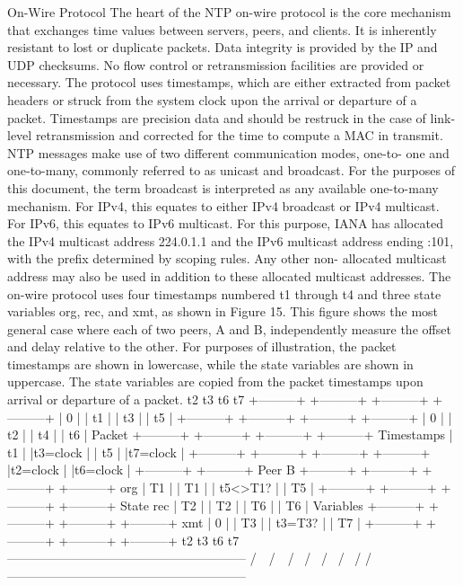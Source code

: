  On-Wire Protocol
 The heart of the NTP on-wire protocol is the core mechanism that
 exchanges time values between servers, peers, and clients. It is
 inherently resistant to lost or duplicate packets. Data integrity is
 provided by the IP and UDP checksums. No flow control or
 retransmission facilities are provided or necessary. The protocol
 uses timestamps, which are either extracted from packet headers or
 struck from the system clock upon the arrival or departure of a
 packet. Timestamps are precision data and should be restruck in the
 case of link-level retransmission and corrected for the time to
 compute a MAC in transmit.
 NTP messages make use of two different communication modes, one-to-
 one and one-to-many, commonly referred to as unicast and broadcast.
 For the purposes of this document, the term broadcast is interpreted
 as any available one-to-many mechanism. For IPv4, this equates to
 either IPv4 broadcast or IPv4 multicast. For IPv6, this equates to
 IPv6 multicast. For this purpose, IANA has allocated the IPv4
 multicast address 224.0.1.1 and the IPv6 multicast address ending
 :101, with the prefix determined by scoping rules. Any other non-
 allocated multicast address may also be used in addition to these
 allocated multicast addresses.
 The on-wire protocol uses four timestamps numbered t1 through t4 and
 three state variables org, rec, and xmt, as shown in Figure 15. This
 figure shows the most general case where each of two peers, A and B,
 independently measure the offset and delay relative to the other.
 For purposes of illustration, the packet timestamps are shown in
 lowercase, while the state variables are shown in uppercase. The
 state variables are copied from the packet timestamps upon arrival or
 departure of a packet.
  t2 t3 t6 t7
 +---------+ +---------+ +---------+ +---------+
 | 0 | | t1 | | t3 | | t5 |
 +---------+ +---------+ +---------+ +---------+
 | 0 | | t2 | | t4 | | t6 | Packet
 +---------+ +---------+ +---------+ +---------+ Timestamps
 | t1 | |t3=clock | | t5 | |t7=clock |
 +---------+ +---------+ +---------+ +---------+
 |t2=clock | |t6=clock |
 +---------+ +---------+
 Peer B
 +---------+ +---------+ +---------+ +---------+
 org | T1 | | T1 | | t5<>T1? | | T5 |
 +---------+ +---------+ +---------+ +---------+ State
 rec | T2 | | T2 | | T6 | | T6 | Variables
 +---------+ +---------+ +---------+ +---------+
 xmt | 0 | | T3 | | t3=T3? | | T7 |
 +---------+ +---------+ +---------+ +---------+
 t2 t3 t6 t7
 ---------------------------------------------------------
 /\ \ /\ \
 / \ / \
 / \ / \
 / \/ / \/
 ---------------------------------------------------------
